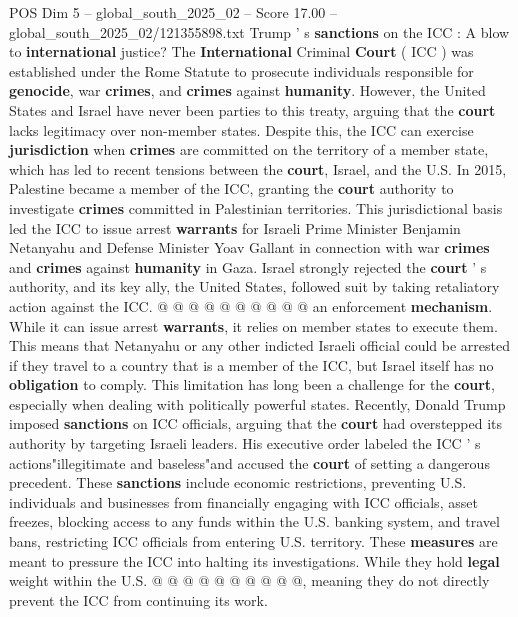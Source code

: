 \begin{textsample}{POS Dim 5 – global\_south\_2025\_02 – Score 17.00 – global\_south\_2025\_02/121355898.txt}  \label{ex:f5_pos_213}
Trump ' s \textbf{sanctions} on the ICC : A blow to \textbf{international} justice?
The \textbf{International} Criminal \textbf{Court} ( ICC ) was established under the Rome Statute to prosecute individuals responsible for \textbf{genocide}, war \textbf{crimes}, and \textbf{crimes} against \textbf{humanity}.
However, the United States and Israel have never been parties to this treaty, arguing that the \textbf{court} lacks legitimacy over non-member states.
Despite this, the ICC can exercise \textbf{jurisdiction} when \textbf{crimes} are committed on the territory of a member state, which has led to recent tensions between the \textbf{court}, Israel, and the U.S.
In 2015, Palestine became a member of the ICC, granting the \textbf{court} authority to investigate \textbf{crimes} committed in Palestinian territories.
This jurisdictional basis led the ICC to issue arrest \textbf{warrants} for Israeli Prime Minister Benjamin Netanyahu and Defense Minister Yoav Gallant in connection with war \textbf{crimes} and \textbf{crimes} against \textbf{humanity} in Gaza.
Israel strongly rejected the \textbf{court} ' s authority, and its key ally, the United States, followed suit by taking retaliatory action against the ICC. @ @ @ @ @ @ @ @ @ @ an enforcement \textbf{mechanism}.
While it can issue arrest \textbf{warrants}, it relies on member states to execute them.
This means that Netanyahu or any other indicted Israeli official could be arrested if they travel to a country that is a member of the ICC, but Israel itself has no \textbf{obligation} to comply.
This limitation has long been a challenge for the \textbf{court}, especially when dealing with politically powerful states.
Recently, Donald Trump imposed \textbf{sanctions} on ICC officials, arguing that the \textbf{court} had overstepped its authority by targeting Israeli leaders.
His executive order labeled the ICC ' s actions"illegitimate and baseless"and accused the \textbf{court} of setting a dangerous precedent.
These \textbf{sanctions} include economic restrictions, preventing U.S. individuals and businesses from financially engaging with ICC officials, asset freezes, blocking access to any funds within the U.S. banking system, and travel bans, restricting ICC officials from entering U.S. territory.
These \textbf{measures} are meant to pressure the ICC into halting its investigations.
While they hold \textbf{legal} weight within the U.S. @ @ @ @ @ @ @ @ @ @, meaning they do not directly prevent the ICC from continuing its work.

\end{textsample}
